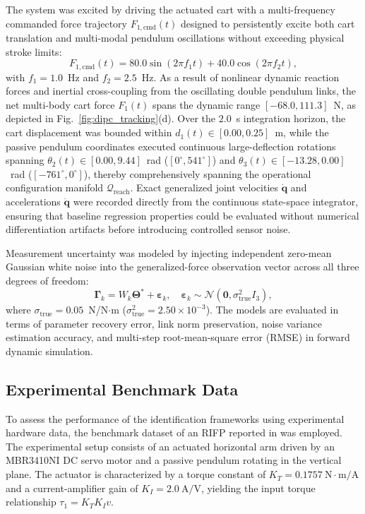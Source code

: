 \documentclass[lettersize,journal]{IEEEtran}
\begin{document}
The system was excited by driving the actuated cart with a multi-frequency commanded force trajectory $F_{1,\text{cmd}}(t)$ designed to persistently excite both cart translation and multi-modal pendulum oscillations without exceeding physical stroke limits:
\begin{equation}
    F_{1,\text{cmd}}(t) = 80.0 \sin(2\pi f_1 t) + 40.0 \cos(2\pi f_2 t),
    \label{eq:dipc_excitation}
\end{equation}
with $f_1 = 1.0$~Hz and $f_2 = 2.5$~Hz. As a result of nonlinear dynamic reaction forces and inertial cross-coupling from the oscillating double pendulum links, the net multi-body cart force $F_1(t)$ spans the dynamic range $[-68.0, 111.3]$~N, as depicted in Fig.~\ref{fig:dipc_tracking}(d). Over the $2.0$~s integration horizon, the cart displacement was bounded within $d_1(t) \in [0.00, 0.25]$~m, while the passive pendulum coordinates executed continuous large-deflection rotations spanning $\theta_2(t) \in [0.00, 9.44]$~rad ($[0^\circ, 541^\circ]$) and $\theta_3(t) \in [-13.28, 0.00]$~rad ($[-761^\circ, 0^\circ]$), thereby comprehensively spanning the operational configuration manifold $\mathcal{Q}_{\text{reach}}$. Exact generalized joint velocities $\dot{\bm{q}}$ and accelerations $\ddot{\bm{q}}$ were recorded directly from the continuous state-space integrator, ensuring that baseline regression properties could be evaluated without numerical differentiation artifacts before introducing controlled sensor noise.

Measurement uncertainty was modeled by injecting independent zero-mean Gaussian white noise into the generalized-force observation vector across all three degrees of freedom:
\begin{equation}
    \bm{\Gamma}_k = W_k \bm{\Theta}^* + \bm{\varepsilon}_k, \quad \bm{\varepsilon}_k \sim \mathcal{N}(\mathbf{0}, \sigma^2_{\text{true}} I_3),
    \label{eq:dipc_noise_model}
\end{equation}
where $\sigma_{\text{true}} = 0.05$~N/N$\cdot$m ($\sigma^2_{\text{true}} = 2.50 \times 10^{-3}$). The models are evaluated in terms of parameter recovery error, link norm preservation, noise variance estimation accuracy, and multi-step root-mean-square error (RMSE) in forward dynamic simulation.

\subsection{Experimental Benchmark Data}
To assess the performance of the identification frameworks using experimental hardware data, the benchmark dataset of an RIFP reported in \cite{AguilarSierra2014} was employed. The experimental setup consists of an actuated horizontal arm driven by an MBR3410NI DC servo motor and a passive pendulum rotating in the vertical plane. The actuator is characterized by a torque constant of \(K_T = 0.1757~\text{N}\cdot\text{m/A}\) and a current-amplifier gain of \(K_I = 2.0~\text{A/V}\), yielding the input torque relationship \(\tau_1 = K_T K_I v\).
\end{document}
